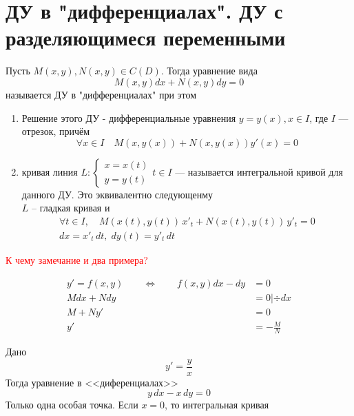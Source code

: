 \author{Andrei Tkachuk}

\section{ДУ в "дифференциалах". ДУ с разделяющимеся переменными}

\begin{Def}
    Пусть $M(x, y), N(x, y) \in C(D)$. Тогда уравнение вида
    \[
        M(x, y)dx + N(x, y)dy = 0
    \]
    называется ДУ в "дифференциалах" при этом
    \begin{enumerate}
        \item Решение этого ДУ - дифференциальные  уравнения $y = y(x), x \in I$, где $I$ --- отрезок, причём\\
        \[
            \forall x \in I \quad M(x, y(x)) + N(x, y(x))y'(x) = 0
        \]
        \item кривая линия $L : 
        \begin{cases}
            x = x(t)\\
            y = y(t)    
        \end{cases} t \in I$ --- называется интегральной кривой для данного ДУ. Это эквивалентно следующенму\\
        $L$ -- гладкая кривая и 
        \begin{multline*}
            \forall t \in I, \quad M(x(t), y(t))\,x'_t + N(x(t), y(t))\,y'_t = 0\\
            dx = x'_t\,dt, \; dy(t) = y'_t\,dt
        \end{multline*}
    \end{enumerate}
\end{Def}

\textcolor{red}{К чему замечание и два примера?}

\begin{Note}
    \begin{align*}
        y' = f(x, y) \qquad \Leftrightarrow \qquad f(x, y)dx - dy &= 0\\
        Mdx + Ndy &= 0 | \div dx\\
        M + Ny' &= 0\\
        y' &= -\frac{M}{N}
    \end{align*}
\end{Note}

\begin{Example} 
    Дано
    \[
        y' = \frac{y}{x}
    \]
    Тогда уравнение в <<диференциалах>>
    \[
        y\,dx - x\,dy = 0
    \]
    Только одна особая точка. Если $x = 0$, то интегральная кривая
\end{Example}

